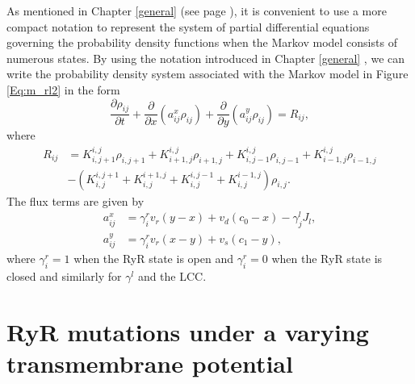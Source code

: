 As mentioned in Chapter \ref{general} (see page \pageref{general}), it is convenient to use a more compact notation to represent the system of partial differential equations governing the probability density functions when the Markov model consists of numerous states. By using the notation introduced in Chapter \ref{general} , we can write the probability density system associated with the Markov model in Figure \ref{Eq:m_rl2} in the form
\begin{equation}
\frac{\partial\rho_{ij}}{\partial t}+\frac{\partial}{\partial x}\left(
a_{ij}^{x}\rho_{ij}\right)  +\frac{\partial}{\partial y}\left(  a_{ij}^{y}%
\rho_{ij}\right)  =R_{ij}, \label{pdf16}%
\end{equation}
where%
\begin{align*}
R_{ij}  & =K_{i,j+1}^{i,j}\rho_{i,j+1}+K_{i+1,j}^{i,j}\rho_{i+1,j}%
+K_{i,j-1}^{i,j}\rho_{i,j-1}+K_{i-1,j}^{i,j}\rho_{i-1,j}\\
& -\left(  K_{i,j}^{i,j+1}+K_{i,j}^{i+1,j}+K_{i,j}^{i,j-1}+K_{i,j}%
^{i-1,j}\right)  \rho_{i,j}.
\end{align*}
 The flux terms are given by%
\begin{align*}
a_{ij}^{x} &  =\gamma^{r}_{i}v_{r}\left(  y-x\right)  +v_{d}\left(
c_{0}-x\right) -\gamma^{l}_{j}J_{l} ,\\
a_{ij}^{y} &  =\gamma^{r}_{i}v_{r}\left(  x-y\right)  +v_{s}\left(
c_{1}-y\right)  ,
\end{align*}
where $\gamma^{r}_{i}=1$ when the RyR state is open and
$\gamma^{r}_{i}=0$ when the RyR state is closed and similarly for $\gamma^{l}$ and the LCC.


\section[RyR mutations]{RyR mutations under a varying transmembrane potential}

